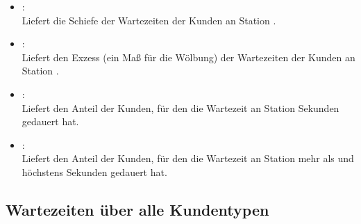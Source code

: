 \begin{itemize}
\item
{}:\\
Liefert die Schiefe der Wartezeiten der Kunden an Station .

\item
{}:\\
Liefert den Exzess (ein Maß für die Wölbung) der Wartezeiten der Kunden an Station .

\item
{}:\\
Liefert den Anteil der Kunden, für den die Wartezeit an Station   Sekunden gedauert hat.

\item
{}:\\
Liefert den Anteil der Kunden, für den die Wartezeit an Station  mehr als  und höchstens  Sekunden gedauert hat.

\end{itemize}



\subsection{Wartezeiten über alle Kundentypen}
  
